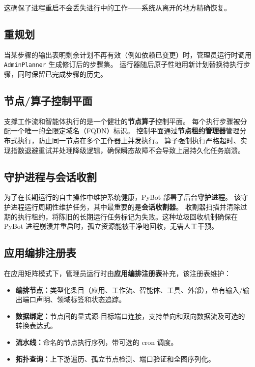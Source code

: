\documentclass[11pt,a4paper]{article}
\begin{document}
这确保了进程重启不会丢失进行中的工作——系统从离开的地方精确恢复。

\subsection{重规划}

当某步骤的输出表明剩余计划不再有效（例如依赖已变更）时，管理员运行时调用 \texttt{AdminPlanner} 生成修订后的步骤集。
运行器随后原子性地用新计划替换待执行步骤，同时保留已完成步骤的历史。

\subsection{节点/算子控制平面}

支撑工作流和智能体执行的是一个健壮的\textbf{节点算子}控制平面。
每个执行步骤被分配一个唯一的全限定域名（FQDN）标识。
控制平面通过\textbf{节点租约管理器}管理分布式执行，防止同一节点在多个工作器上并发执行。
算子强制执行严格超时、实现指数退避重试并处理降级逻辑，确保瞬态故障不会导致上层持久化任务崩溃。

\subsection{守护进程与会话收割}

为了在长期运行的自主操作中维护系统健康，PyBot 部署了后台\textbf{守护进程}。
该守护进程运行周期性维护任务，其中最重要的是\textbf{会话收割器}。
收割器扫描并清除过期的执行租约，将陈旧的长期运行任务标记为失败。这种垃圾回收机制确保在 PyBot 进程崩溃并重启时，孤立资源能被干净地回收，无需人工干预。

\subsection{应用编排注册表}

在应用矩阵模式下，管理员运行时由\textbf{应用编排注册表}补充，该注册表维护：

\begin{itemize}
  \item \textbf{编排节点：}类型化条目（应用、工作流、智能体、工具、外部），带有输入/输出端口声明、领域标签和状态追踪。
  \item \textbf{数据绑定：}节点间的显式源-目标端口连接，支持单向和双向数据流及可选的转换表达式。
  \item \textbf{流水线：}命名的节点执行序列，带可选的 cron 调度。
  \item \textbf{拓扑查询：}上下游遍历、孤立节点检测、端口验证和全图序列化。
\end{itemize}
\end{document}
